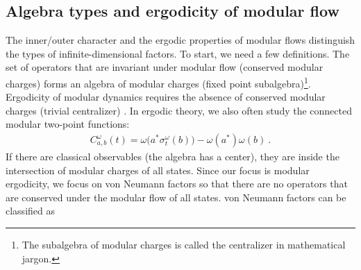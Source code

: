 \documentclass[a4paper,11pt]{article}
\theoremstyle{definition}
\newcommand{\mM}{\mathcal{M}}
\begin{document}
\subsection{Algebra types and ergodicity of modular flow}\label{subsec:types-modular}


The inner/outer character and the ergodic properties of modular flows distinguish the types of infinite-dimensional factors. To start, we need a few definitions.
The set of operators that are invariant under modular flow (conserved modular charges) forms an algebra of modular charges (fixed point subalgebra)\footnote{The subalgebra of modular charges is called {the centralizer} in mathematical jargon.}. Ergodicity of modular dynamics requires the absence of conserved modular charges (trivial centralizer) \cite{longo1979notes,ouseph2024local}.
In ergodic theory, we also often study the connected modular two-point functions:
\begin{align}
    C^{\omega}_{a,b}(t)=\omega\bigl(a^*\sigma^\omega_t(b)\bigr)-\omega(a^*)\omega(b)\ .\label{eq:modular-correlation}
\end{align}
If there are classical observables (the algebra has a center), they are inside the intersection of modular charges of all states. Since our focus is modular ergodicity, we focus on von Neumann factors so that there are no operators that are conserved under the modular flow of all states. von Neumann factors can be classified as
\end{document}

